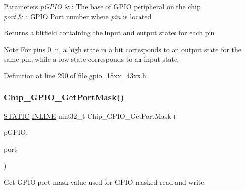 \begin{DoxyParams}{Parameters}
{\em p\+G\+P\+IO} & \+: The base of G\+P\+IO peripheral on the chip \\
\hline
{\em port} & \+: G\+P\+IO Port number where {\itshape pin} is located \\
\hline
\end{DoxyParams}
\begin{DoxyReturn}{Returns}
a bitfield containing the input and output states for each pin 
\end{DoxyReturn}
\begin{DoxyNote}{Note}
For pins 0..n, a high state in a bit corresponds to an output state for the same pin, while a low state corresponds to an input state. 
\end{DoxyNote}


Definition at line 290 of file gpio\+\_\+18xx\+\_\+43xx.\+h.

\mbox{\label{group___g_p_i_o__18_x_x__43_x_x_ga6b8d692c29a4d64326130bd237826a4b}} 
\subsubsection{\texorpdfstring{Chip\+\_\+\+G\+P\+I\+O\+\_\+\+Get\+Port\+Mask()}{Chip\_GPIO\_GetPortMask()}}
{\footnotesize\ttfamily \hyperlink{group___l_p_c___types___public___macros_ga10b2d890d871e1489bb02b7e70d9bdfb}{S\+T\+A\+T\+IC} \hyperlink{spifi__18xx__43xx_8h_a2eb6f9e0395b47b8d5e3eeae4fe0c116}{I\+N\+L\+I\+NE} uint32\+\_\+t Chip\+\_\+\+G\+P\+I\+O\+\_\+\+Get\+Port\+Mask (\begin{DoxyParamCaption}\item[{\hyperlink{struct_l_p_c___g_p_i_o___t}{L\+P\+C\+\_\+\+G\+P\+I\+O\+\_\+T} $\ast$}]{p\+G\+P\+IO,  }\item[{uint8\+\_\+t}]{port }\end{DoxyParamCaption})}



Get G\+P\+IO port mask value used for G\+P\+IO masked read and write. 


